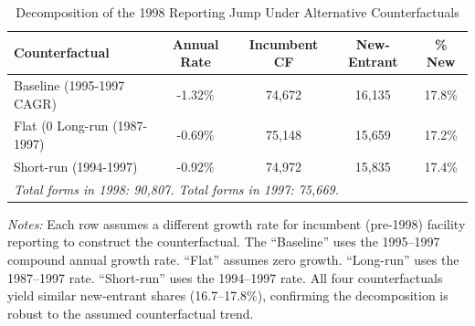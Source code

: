 \begin{table}[H]
\centering
\caption{Decomposition of the 1998 Reporting Jump Under Alternative Counterfactuals}
\label{tab:main}
\begin{threeparttable}
\begin{tabular}{lcccc}
\toprule
Counterfactual & Annual Rate & Incumbent CF & New-Entrant & \% New \\
\midrule
Baseline (1995-1997 CAGR) & -1.32\% & 74,672 & 16,135 & 17.8\% \\
Flat (0%
Long-run (1987-1997) & -0.69\% & 75,148 & 15,659 & 17.2\% \\
Short-run (1994-1997) & -0.92\% & 74,972 & 15,835 & 17.4\% \\
\midrule
\multicolumn{5}{l}{\textit{Total forms in 1998: 90,807. Total forms in 1997: 75,669.}} \\
\bottomrule
\end{tabular}
\begin{tablenotes}[flushleft]
\small
\item \textit{Notes:} Each row assumes a different growth rate for incumbent (pre-1998) facility reporting to construct the counterfactual. The ``Baseline'' uses the 1995--1997 compound annual growth rate. ``Flat'' assumes zero growth. ``Long-run'' uses the 1987--1997 rate. ``Short-run'' uses the 1994--1997 rate. All four counterfactuals yield similar new-entrant shares (16.7--17.8\%), confirming the decomposition is robust to the assumed counterfactual trend.
\end{tablenotes}
\end{threeparttable}
\end{table}
